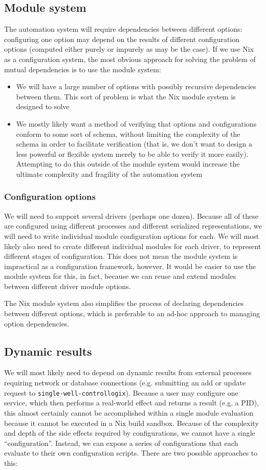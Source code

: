 \documentclass[11pt]{article}
\begin{document}
\subsection*{Module system}
\label{sec:org744e859}
The automation system will require dependencies between different options: configuring one option may depend on the results of different configuration options (computed either purely or impurely as may be the case). If we use Nix as a configuration system, the most obvious approach for solving the problem of mutual dependencies is to use the module system:
\begin{itemize}
\item We will have a large number of options with possibly recursive dependencies between them. This sort of problem is what the Nix module system is designed to solve
\item We mostly likely want a method of verifying that options and configurations conform to some sort of schema, without limiting the complexity of the schema in order to facilitate verification (that is, we don't want to design a less powerful or flexible system merely to be able to verify it more easily). Attempting to do this outside of the module system would increase the ultimate complexity and fragility of the automation system
\end{itemize}
\subsubsection*{Configuration options}
\label{sec:orgd526374}
We will need to support several drivers (perhaps one dozen). Because all of these are configured using different processes and different serialized representations, we will need to write individual module configuration options for each. We will most likely also need to create different individual modules for each driver, to represent different stages of configuration. This does not mean the module system is impractical as a configuration framework, however. It would be easier to use the module system for this, in fact, because we can reuse and extend modules between different driver module options.

The Nix module system also simplifies the process of declaring dependencies between different options, which is preferable to an ad-hoc approach to managing option dependencies.
\subsection*{Dynamic results}
\label{sec:org0b44a01}
We will most likely need to depend on dynamic results from external processes requiring network or database connections (e.g. submitting an add or update request to \texttt{single-well-controllogix}). Because a user may configure one service, which then performs a real-world effect and returns a result (e.g. a PID), this almost certainly cannot be accomplished within a single module evaluation because it cannot be executed in a Nix build sandbox. Because of the complexity and depth of the side effects required by configurations, we cannot have a single ``configuration''. Instead, we can expose a series of configurations that each evaluate to their own configuration scripts. There are two possible approaches to this:
\end{document}
